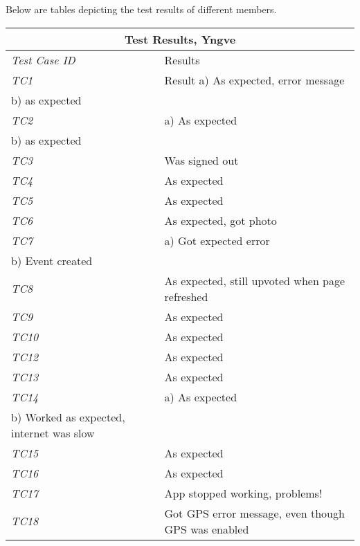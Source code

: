 Below are tables depicting the test results of different members. 
%
\begin{minipage}{\linewidth}
\setlength{\tabcolsep}{15pt}
\centering
{}
\begin{tabular}{ |l|p{70mm}| }
	\hline
	\multicolumn{2}{|c|}{\cellcolor{gray!25} \textbf{Test Results, Yngve}} \\
	\hline
	\it{\cellcolor{gray!25}Test Case ID} & {\cellcolor{gray!25} Results } \\
	\hline
	\it{\cellcolor{gray!25}TC1} & Result a) As expected, error message
\\b) as expected \\ \hline
	\it{\cellcolor{gray!25}TC2} & a) As expected
\\b) as expected \\ \hline
	\it{\cellcolor{gray!25}TC3} & Was signed out \\ \hline
	\it{\cellcolor{gray!25}TC4} & As expected \\ \hline
	\it{\cellcolor{gray!25}TC5} & As expected \\ \hline
	\it{\cellcolor{gray!25}TC6} & As expected, got photo \\ \hline
	\it{\cellcolor{gray!25}TC7} & a) Got expected error
\\b) Event created \\ \hline
	\it{\cellcolor{gray!25}TC8} & As expected, still upvoted when page refreshed \\ \hline
	\it{\cellcolor{gray!25}TC9} & As expected \\ \hline
	\it{\cellcolor{gray!25}TC10} & As expected \\ \hline
	\it{\cellcolor{gray!25}TC12} & As expected \\ \hline
	\it{\cellcolor{gray!25}TC13} & As expected \\ \hline
	\it{\cellcolor{gray!25}TC14} & a) As expected
\\b) Worked as expected, internet was slow \\ \hline
	\it{\cellcolor{gray!25}TC15} & As expected \\ \hline
	\it{\cellcolor{gray!25}TC16} & As expected \\ \hline
	\it{\cellcolor{gray!25}TC17} & App stopped working, problems! \\ \hline
	\it{\cellcolor{gray!25}TC18} & Got GPS error message, even though GPS was enabled \\ \hline
	\hline
\end{tabular}
\medskip
\end{minipage}

